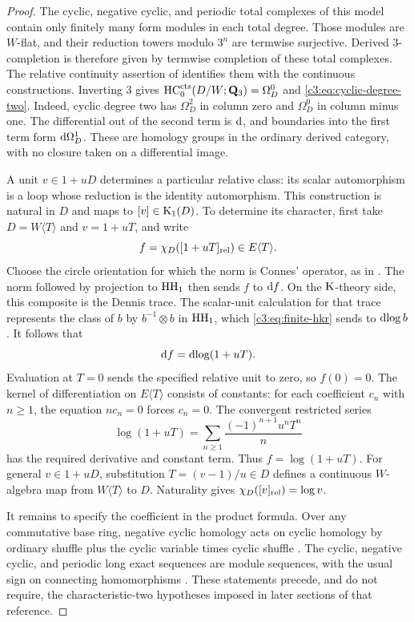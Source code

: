 \begin{proof}
The cyclic, negative cyclic, and periodic total complexes of this
model contain only finitely many form modules in each total degree.
Those modules are $W$-flat, and their reduction towers modulo $3^n$
are termwise surjective.
Derived $3$-completion is therefore given by termwise completion
of these total complexes.
The relative continuity assertion of
\cite[Proposition~4.2 and the paragraph preceding
Proposition~4.10]{AMMN} identifies them with the continuous
constructions. Inverting $3$ gives
$\operatorname{HC}^{\mathrm{cts}}_0(D/W;\mathbf{Q}_3)=\Omega_D^0$ and
\eqref{c3:eq:cyclic-degree-two}.
Indeed, cyclic degree two has $\Omega_D^2$ in column zero and
$\Omega_D^0$ in column minus one.
The differential out of the second term is $\mathrm{d}$, and boundaries
into the first term form $\mathrm{d}\Omega_D^1$.
These are homology groups in the ordinary derived category, with
no closure taken on a differential image.

A unit $v\in1+uD$ determines a particular relative class: its scalar
automorphism is a loop whose reduction is the identity automorphism.
This construction is natural in $D$ and maps to $[v]\in\operatorname{K}_1(D)$.
To determine its character, first take $D=W\langle T\rangle$ and
$v=1+uT$, and write
\[
 f=\chi_D([1+uT]_{\mathrm{rel}})\in E\langle T\rangle.
\]
Choose the circle orientation for which the norm is Connes' operator,
as in \cite[Lemma~2.2 and Theorem~2.3]{HoyoisCircle}.
The norm followed by projection to $\operatorname{HH}_1$ then sends $f$ to $\mathrm{d} f$.
On the $\operatorname{K}$-theory side, this composite is the Dennis trace.
The scalar-unit calculation for that trace represents the class of
$b$ by $b^{-1}\otimes b$ in $\operatorname{HH}_1$, which
\eqref{c3:eq:finite-hkr} sends to $\operatorname{dlog} b$.
It follows that
\[
 \mathrm{d} f=\operatorname{dlog}(1+uT).
\]
Evaluation at $T=0$ sends the specified relative unit to zero, so
$f(0)=0$.
The kernel of differentiation on $E\langle T\rangle$ consists of
constants: for each coefficient $c_n$ with $n\geq1$, the equation
$n c_n=0$ forces $c_n=0$.
The convergent restricted series
\[
 \log(1+uT)
   =\sum_{n\geq1}\frac{(-1)^{n+1}u^nT^n}{n}
\]
has the required derivative and constant term.
Thus $f=\log(1+uT)$.
For general $v\in1+uD$, substitution
$T=(v-1)/u\in D$ defines a continuous $W$-algebra map from
$W\langle T\rangle$ to $D$.
Naturality gives $\chi_D([v]_{\mathrm{rel}})=\log v$.

It remains to specify the coefficient in the product formula.
Over any commutative base ring, negative cyclic homology acts on
cyclic homology by ordinary shuffle plus the cyclic variable times
cyclic shuffle
\cite[\S2, Definition~2.1 and Remark~2.2]{BokstedtOttosen}.
The cyclic, negative cyclic, and periodic long exact sequences are
module sequences, with the usual sign on connecting homomorphisms
\cite[Proposition~2.3]{BokstedtOttosen}.
These statements precede, and do not require, the characteristic-two
hypotheses imposed in later sections of that reference.


\end{proof}
